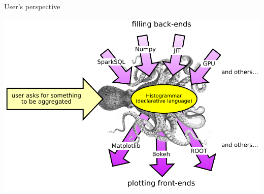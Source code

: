 \documentclass[aspectratio=169]{beamer}
\begin{document}
\begin{frame}{User's perspective}
\vspace{0.5 cm}
\begin{center}
\includegraphics[width=0.75\linewidth]{front-back-ends.pdf}\mbox{\hspace{2 cm}}
\end{center}
\end{frame}
\end{document}
